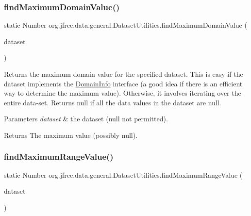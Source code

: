 \subsubsection{\texorpdfstring{find\+Maximum\+Domain\+Value()}{findMaximumDomainValue()}}
{\footnotesize\ttfamily static Number org.\+jfree.\+data.\+general.\+Dataset\+Utilities.\+find\+Maximum\+Domain\+Value (\begin{DoxyParamCaption}\item[{\mbox{\hyperlink{interfaceorg_1_1jfree_1_1data_1_1xy_1_1_x_y_dataset}{X\+Y\+Dataset}}}]{dataset }\end{DoxyParamCaption})\hspace{0.3cm}{\ttfamily [static]}}

Returns the maximum domain value for the specified dataset. This is easy if the dataset implements the \mbox{\hyperlink{interfaceorg_1_1jfree_1_1data_1_1_domain_info}{Domain\+Info}} interface (a good idea if there is an efficient way to determine the maximum value). Otherwise, it involves iterating over the entire data-\/set. Returns {\ttfamily null} if all the data values in the dataset are {\ttfamily null}.


\begin{DoxyParams}{Parameters}
{\em dataset} & the dataset ({\ttfamily null} not permitted).\\
\hline
\end{DoxyParams}
\begin{DoxyReturn}{Returns}
The maximum value (possibly {\ttfamily null}). 
\end{DoxyReturn}
\mbox{\label{classorg_1_1jfree_1_1data_1_1general_1_1_dataset_utilities_a849e09415d75fa1411cf1ee2f0538a75}} 
\subsubsection{\texorpdfstring{find\+Maximum\+Range\+Value()}{findMaximumRangeValue()}\hspace{0.1cm}{\footnotesize\ttfamily [1/2]}}
{\footnotesize\ttfamily static Number org.\+jfree.\+data.\+general.\+Dataset\+Utilities.\+find\+Maximum\+Range\+Value (\begin{DoxyParamCaption}\item[{\mbox{\hyperlink{interfaceorg_1_1jfree_1_1data_1_1category_1_1_category_dataset}{Category\+Dataset}}}]{dataset }\end{DoxyParamCaption})\hspace{0.3cm}{\ttfamily [static]}}

